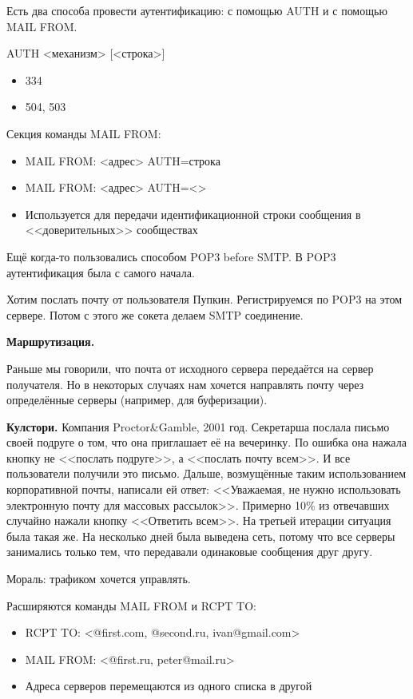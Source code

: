 Есть два способа провести аутентификацию: с помощью AUTH и с помощью MAIL FROM.

AUTH <механизм> [<строка>]
\begin{itemize}
    \item 334
    \item 504, 503
\end{itemize}

Секция команды MAIL FROM:
\begin{itemize}
    \item MAIL FROM: <адрес> AUTH=строка
    \item MAIL FROM: <адрес> AUTH=<>
    \item Используется для передачи идентификационной строки сообщения в <<доверительных>> сообществах
\end{itemize}

Ещё когда-то пользовались способом POP3 before SMTP. В POP3 аутентификация была с самого начала.

Хотим послать почту от пользователя Пупкин. Регистрируемся по POP3 на этом сервере. Потом с этого же сокета делаем SMTP соединение.

{\bf Маршрутизация.}

Раньше мы говорили, что почта от исходного сервера передаётся на сервер получателя. Но в некоторых случаях нам хочется направлять почту через определённые серверы (например, для буферизации).

{\bf Кулстори.} Компания Proctor\&Gamble, 2001 год. Секретарша послала письмо своей подруге о том, что она приглашает её на вечеринку. По ошибка она нажала кнопку не <<послать подруге>>, а <<послать почту всем>>. И все пользователи получили это письмо. Дальше, возмущённые таким использованием корпоративной почты, написали ей ответ: <<Уважаемая, не нужно использовать электронную почту для массовых рассылок>>. Примерно 10\% из отвечавших случайно нажали кнопку <<Ответить всем>>. На третьей итерации ситуация была такая же. На несколько дней была выведена сеть, потому что все серверы занимались только тем, что передавали одинаковые сообщения друг другу.

Мораль: трафиком хочется управлять. 

Расширяются команды MAIL FROM и RCPT TO:
\begin{itemize}
    \item RCPT TO: <@first.com, @second.ru, ivan@gmail.com>
    \item MAIL FROM: <@first.ru, peter@mail.ru>
    \item Адреса серверов перемещаются из одного списка в другой
\end{itemize}

